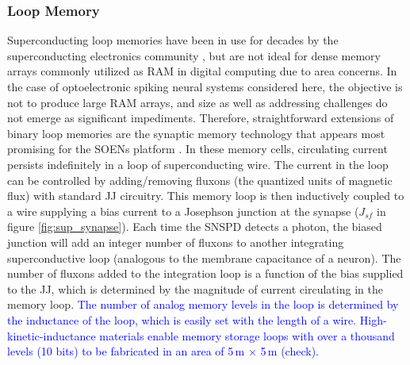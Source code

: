 \documentclass[twocolumn]{article}
\begin{document}
\subsubsection{Loop Memory}\label{Loops}
Superconducting loop memories have been in use for decades by the superconducting electronics community \cite{vatu1998,ka1999}, but are not ideal for dense memory arrays commonly utilized as RAM in digital computing due to area concerns. In the case of optoelectronic spiking neural systems considered here, the objective is not to produce large RAM arrays, and size as well as addressing challenges do not emerge as significant impediments. Therefore, straightforward extensions of binary loop memories are the synaptic memory technology that appears most promising for the SOENs platform \cite{sh2018,shainline2019superconducting}. In these memory cells, circulating current persists indefinitely in a loop of superconducting wire. The current in the loop can be controlled by adding/removing fluxons (the quantized units of magnetic flux) with standard JJ circuitry. This memory loop is then inductively coupled to a wire supplying a bias current to a Josephson junction at the synapse ($J_{sf}$ in figure \ref{fig:sup_synapse}). Each time the SNSPD detects a photon, the biased junction will add an integer number of fluxons to another integrating superconductive loop (analogous to the membrane capacitance of a neuron). The number of fluxons added to the integration loop is a function of the bias supplied to the JJ, which is determined by the magnitude of current circulating in the memory loop. \textcolor{blue}{The number of analog memory levels in the loop is determined by the inductance of the loop, which is easily set with the length of a wire. High-kinetic-inductance materials \cite{tobo2018} enable memory storage loops with over a thousand levels (10 bits) to be fabricated in an area of 5\,\textmu m $\times$ 5\,\textmu m (check).}
\end{document}

